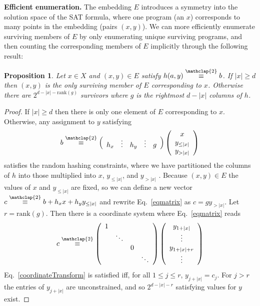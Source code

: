 \documentclass{article}
\newtheorem{proposition}{Proposition}
\newcommand\modt{\stackrel{\mathclap{\normalfont 2}}{\equiv}}
\begin{document}
  \textbf{Efficient enumeration.} The embedding $E$ introduces a symmetry into the solution space of the SAT formula, where one program (an $x$) corresponds to many points in the embedding (pairs $(x,y)$).
  We can more efficiently enumerate surviving members of $E$ by only enumerating unique surviving programs,
  and then counting the corresponding members of $E$ implicitly through the following result:
  \begin{proposition}\label{ranktheorem}
    Let $x\in X$ and $(x,y)\in E $ satisfy $h(a,y) \modt b$.  If $|x| \geq d$ then $(x,y)$ is the only surviving member of $E$ corresponding to $x$. Otherwise there are $2^{d - |x| - \text{rank}(g)}$ survivors where $g$ is the rightmost $d - |x|$ columns of $h$.
  \end{proposition}
  \begin{proof}
    If $|x|\geq d$ then there is only one element of $E$ corresponding to $x$.
    Otherwise,
    any assignment to $y$ satisfying
    \begin{equation}\label{eqmatrix}
      b \modt \left( \begin{array}{ccccc}
h_{x} & \vdots& h_{y} &\vdots& g %
      \end{array} \right) \left( \begin{array}{c}
x \\
y_{\leq |x|} \\
y_{ > |x|}  \end{array} \right)
    \end{equation}
    satisfies the random hashing constraints, where we have partitioned the columns of $h$ into those multiplied into $x$, $y_{\leq|x|}$, and $y_{ > |x|}$ .
    Because $(x,y)\in E$ the values of $x$ and $y_{\leq |x|}$ are fixed,
    so we can define a new vector $c \modt b + h_x x + h_y y_{\leq |x|}$ and rewrite Eq.~\ref{eqmatrix} as
    $c = g y_{ > |x|}$.
    Let $r = \text{rank}(g)$.
    Then there is a coordinate system where Eq.~\ref{eqmatrix} reads
    \begin{equation}\label{coordinateTransform}
      c \modt \left( \begin{array}{cccc}
        1&&&\\
        &\ddots&&\\
        &&0&\\
        &&&\ddots \end{array} \right) \left( \begin{array}{c}
        y_{1+|x|} \\
        \vdots\\
        y_{1+|x|+r}\\
        \vdots\end{array} \right)
    \end{equation}
    Eq.~\ref{coordinateTransform}     is satisfied iff, for all $1\leq j\leq r$, $y_{j+|x|} = c_j$.
    For $j > r$ the entries of $y_{j+|x|} $ are unconstrained,
    and so $2^{d  - |x| - r}$  satisfying values for $y$ exist.
  \end{proof}
\end{document}
